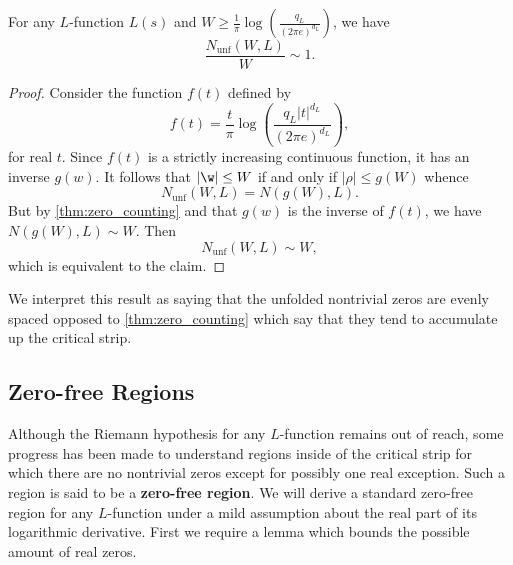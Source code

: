 \documentclass[12pt]{article}
\begin{document}
      \begin{proposition}\label{prop:unfolded_zeros_are_evenly_spaced}
      For any \(L\)-function \(L(s)\) and \(W \ge \frac{1}{\pi}\log\left(\frac{q_{L}}{(2\pi e)^{d_{L}}}\right)\), we have
      \[
        \frac{N_{\text{unf}}(W,L)}{W} \sim 1.
      \]
      \end{proposition}
      \begin{proof}
        Consider the function \(f(t)\) defined by
        \[
          f(t) = \frac{t}{\pi}\log\left(\frac{q_{L}|t|^{d_{L}}}{(2\pi e)^{d_{L}}}\right),
        \]
        for real \(t\). Since \(f(t)\) is a strictly increasing continuous function, it has an inverse \(g(w)\). It follows that \(|\w| \le W\) if and only if \(|\rho| \le g(W)\) whence
        \[
          N_{\text{unf}}(W,L) = N(g(W),L).
        \]
        But by \cref{thm:zero_counting} and that \(g(w)\) is the inverse of \(f(t)\), we have \(N(g(W),L) \sim W\). Then
        \[
          N_{\text{unf}}(W,L) \sim W,
        \]
        which is equivalent to the claim.
      \end{proof}

      We interpret this result as saying that the unfolded nontrivial zeros are evenly spaced opposed to \cref{thm:zero_counting} which say that they tend to accumulate up the critical strip.
    \subsection{Zero-free Regions}
      Although the Riemann hypothesis for any \(L\)-function remains out of reach, some progress has been made to understand regions inside of the critical strip for which there are no nontrivial zeros except for possibly one real exception. Such a region is said to be a \textbf{zero-free region}. We will derive a standard zero-free region for any \(L\)-function under a mild assumption about the real part of its logarithmic derivative. First we require a lemma which bounds the possible amount of real zeros.
\end{document}
